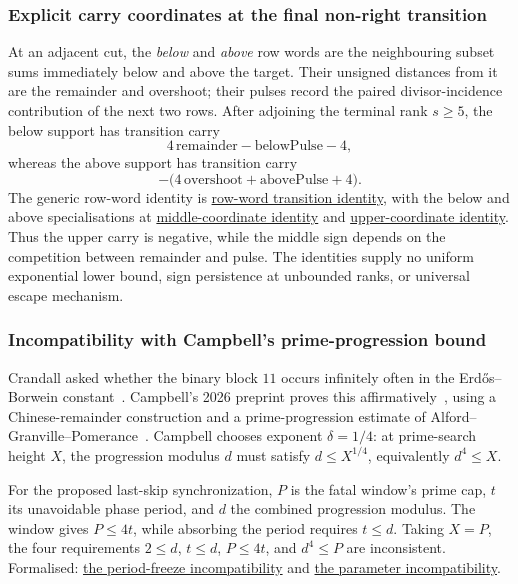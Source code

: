 \documentclass[11pt]{article}
\newcommand{\commit}{ebc98ee71f6819bd9fe344a0bb343542c604e533}
\newcommand{\repobase}{https://github.com/wcook04/plectis-lean-erdos249-257/blob/\commit}
\newcommand{\PK}{Erdos249257}
\newcommand{\lword}[4]{\href{\repobase/\PK/#1\#L#2}{#4}}
\theoremstyle{definition}
\theoremstyle{remark}
\begin{document}
{\subsubsection{Explicit carry coordinates at the final non-right transition}
\label{res:producercarrycoordinates}

At an adjacent cut, the \emph{below} and \emph{above} row words are the
neighbouring subset sums immediately below and above the target.  Their
unsigned distances from it are the remainder and overshoot; their pulses
record the paired divisor-incidence contribution of the next two rows.
After adjoining the terminal rank \(s\ge5\), the below support has transition
carry
\[
  4\,\mathrm{remainder}-\mathrm{belowPulse}-4,
\]
whereas the above support has transition carry
\[
  -\bigl(4\,\mathrm{overshoot}+\mathrm{abovePulse}+4\bigr).
\]
The generic row-word identity is
\lword{HalfCylinderProducerLowerBound.lean}{105}{producerCarry_insert_seamWordSupport_eq}{row-word transition identity},
with the below and above specialisations at
\lword{HalfCylinderProducerLowerBound.lean}{150}{producerCarry_insert_seamBelowSupport_eq_middleCoordinate}{middle-coordinate identity}
and
\lword{HalfCylinderProducerLowerBound.lean}{183}{producerCarry_insert_seamAboveSupport_eq_neg_upperCoordinate}{upper-coordinate identity}.
Thus the upper carry is negative, while the middle sign depends on the
competition between remainder and pulse.  The identities supply no uniform
exponential lower bound, sign persistence at unbounded ranks, or universal
escape mechanism.

\subsubsection{Incompatibility with Campbell's prime-progression bound}
\label{res:campbellboundary}

Crandall asked whether the binary block \(11\) occurs infinitely often in
the Erd\H{o}s--Borwein constant~\cite{crandall}.  Campbell's 2026 preprint
proves this affirmatively~\cite{campbell}, using a Chinese-remainder
construction and a prime-progression estimate of
Alford--Granville--Pomerance~\cite{alfordgranvillepomerance}.
Campbell chooses
exponent \(\delta=1/4\): at prime-search height \(X\), the progression
modulus \(d\) must satisfy \(d\le X^{1/4}\), equivalently \(d^4\le X\).

For the proposed last-skip synchronization, \(P\) is the fatal window's
prime cap, \(t\) its unavoidable phase period, and \(d\) the combined
progression modulus.  The window gives \(P\le4t\), while absorbing the
period requires \(t\le d\).  Taking \(X=P\), the four requirements
\(2\le d\), \(t\le d\), \(P\le4t\), and \(d^4\le P\) are inconsistent.
Formalised:
\lword{CampbellShiftSynchronization.lean}{299}{campbellQuarterExponent_periodFreeze_noSync}{the period-freeze incompatibility}
and
\lword{CampbellShiftSynchronization.lean}{320}{campbellPhaseFreeze_parameters_impossible}{the parameter incompatibility}.

}
\end{document}
